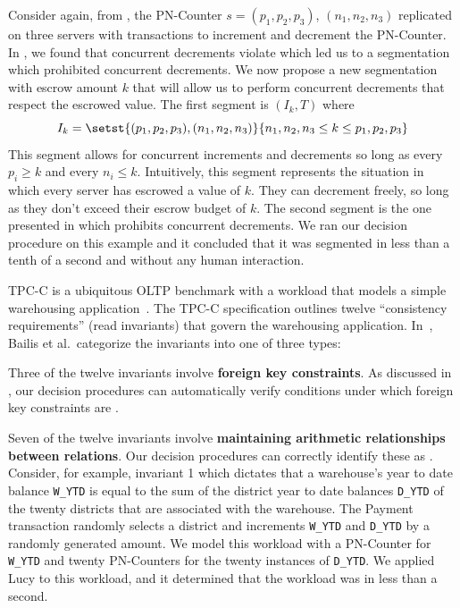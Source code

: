 Consider again, from , the PN-Counter $s =
(p_1, p_2, p_3)$, $(n_1, n_2, n_3)$ replicated on three servers with
transactions to increment and decrement the PN-Counter. In
, we found that concurrent decrements violate
\invariantconfluence{} which led us to a segmentation which prohibited
concurrent decrements. We now propose a new segmentation with escrow amount $k$
that will allow us to perform concurrent decrements that respect the escrowed
value. The first segment is $(I_k, T)$ where
\[
  I_k = \setst{(p_1, p_2, p_3), (n_1, n_2, n_3)}{n_1, n_2, n_3 \leq k \leq p_1, p_2, p_3}
\]
This segment allows for concurrent increments and decrements so long as every
$p_i \geq k$ and every $n_i \leq k$.  Intuitively, this segment represents the
situation in which every server has escrowed a value of $k$. They can decrement
freely, so long as they don't exceed their escrow budget of $k$. The second
segment is the one presented in  which
prohibits concurrent decrements. We ran our decision procedure on this example
and it concluded that it was segmented \invariantconfluent{} in less than a
tenth of a second and without any human interaction.

\example[TPC-C]
TPC-C is a ubiquitous OLTP benchmark with a workload that models a simple
warehousing application~\cite{difallah2013oltp}. The TPC-C specification
outlines twelve ``consistency requirements'' (read invariants) that govern the
warehousing application. In~\cite{bailis2014coordination}, Bailis et al.\
categorize the invariants into one of three types:

    Three of the twelve invariants involve \textbf{foreign key constraints}.  As
    discussed in \exampleref{ForeignKeysEval}, our decision procedures can
    automatically verify conditions under which foreign key constraints are
    \invariantconfluent{}.

    \newcommand{\ttt}[1]{{\smaller \texttt{#1}}} Seven of the twelve invariants
    involve \textbf{maintaining arithmetic relationships between relations}.
    Our decision procedures can correctly identify these as
    \invariantconfluent{}. Consider, for example, invariant 1 which dictates
    that a warehouse's year to date balance \ttt{W\_YTD} is equal to the sum of
    the district year to date balances \ttt{D\_YTD} of the twenty districts
    that are associated with the warehouse. The Payment transaction randomly
    selects a district and increments \ttt{W\_YTD} and \ttt{D\_YTD} by a
    randomly generated amount. We model this workload with a PN-Counter for
    \ttt{W\_YTD} and twenty PN-Counters for the twenty instances of
    \ttt{D\_YTD}. We applied Lucy to this workload, and it determined that the
    workload was \invariantconfluent{} in less than a second.

